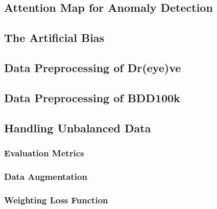 \subsection{Attention Map for Anomaly Detection}

\subsection{The Artificial Bias}

\subsection{Data Preprocessing of Dr(eye)ve}

\subsection{Data Preprocessing of BDD100k}


\subsection{Handling Unbalanced Data}

\subsubsection{Evaluation Metrics}

\subsubsection{Data Augmentation}



\subsubsection{Weighting Loss Function}


